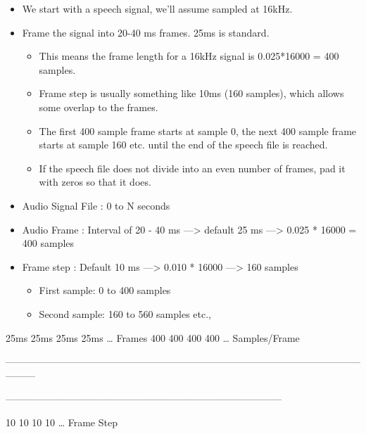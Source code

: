 \documentclass[letterpaper,10pt,english]{sphinxmanual}
\begin{document}
\begin{itemize}
\item {} 
We start with a speech signal, we’ll assume sampled at 16kHz.

\item {} 
Frame the signal into 20-40 ms frames. 25ms is standard.
\begin{itemize}
\item {} 
This means the frame length for a 16kHz signal is 0.025*16000 = 400 samples.

\item {} 
Frame step is usually something like 10ms (160 samples), which allows some overlap to the frames.

\item {} 
The first 400 sample frame starts at sample 0, the next 400 sample frame starts at sample 160 etc. until the end of the speech file is reached.

\item {} 
If the speech file does not divide into an even number of frames, pad it with zeros so that it does.

\end{itemize}

\item {} 
Audio Signal File : 0 to N seconds

\item {} 
Audio Frame : Interval of 20 - 40 ms —\textgreater{} default 25 ms —\textgreater{} 0.025 * 16000 = 400 samples

\item {} 
Frame step : Default 10 ms —\textgreater{} 0.010 * 16000 —\textgreater{} 160 samples
\begin{itemize}
\item {} 
First sample: 0 to 400 samples

\item {} 
Second sample: 160 to 560 samples etc.,

\end{itemize}

\end{itemize}

%
\begin{sphinxVerbatim}[commandchars=\\\{\}]
25ms    25ms   25ms   25ms …  Frames  
400     400    400    400  …  Samples/Frame 

\textbar{}—————\textbar{}—————\textbar{}—————\textbar{}—————\textbar{}—————\textbar{}—————\textbar{}—————\textbar{}————\PYGZhy{}\textbar{}   

\textbar{}—\textbar{}—\textbar{}—\textbar{}—\textbar{}—\textbar{}—\textbar{}—\textbar{}—\textbar{}—\textbar{}—\textbar{}—\textbar{}—\textbar{}—\textbar{}—\textbar{}—\textbar{}—\textbar{}—\textbar{}—\textbar{}—\textbar{}—\textbar{}—\textbar{}—\textbar{}—\textbar{}—\textbar{}—\textbar{}—\textbar{}—\textbar{}—\textbar{}   

10 10 10 10 … Frame Step
\end{sphinxVerbatim}
\end{document}
